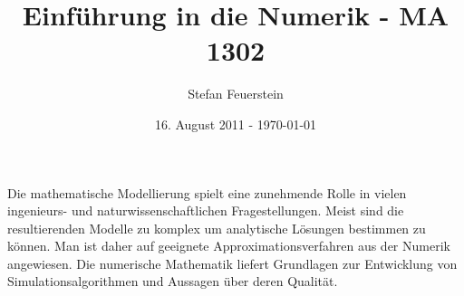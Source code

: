 \documentclass[10pt,a4paper]{article}
\author{Stefan Feuerstein}
\title {Einführung in die Numerik - MA 1302}
\date  {16. August 2011 - \today}
\theoremstyle{definition} \newtheorem{definition}{Definition}[section]
\theoremstyle{remark}     \newtheorem*{bemerkung}{\textbf{Bemerkung}} %
\begin{document}
\maketitle

Die mathematische Modellierung spielt eine zunehmende Rolle in vielen
ingenieurs- und naturwissenschaftlichen Fragestellungen.  Meist sind die
resultierenden Modelle zu komplex um analytische Lösungen bestimmen zu können.
Man ist daher auf geeignete Approximationsverfahren aus der Numerik angewiesen.
Die numerische Mathematik liefert Grundlagen zur Entwicklung von
Simulationsalgorithmen und Aussagen über deren Qualität.


\end{document}
